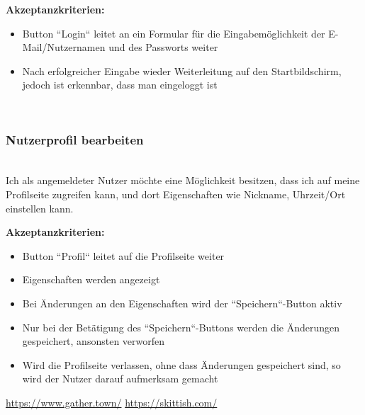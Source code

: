 \documentclass[conference]{IEEEtran}
\begin{document}
	\textbf{Akzeptanzkriterien:}
	\begin{itemize}
		\item Button ``Login`` leitet an ein Formular für die Eingabemöglichkeit der E-Mail/Nutzernamen und des Passworts weiter
		\item Nach erfolgreicher Eingabe wieder Weiterleitung auf den Startbildschirm, jedoch ist erkennbar, dass man eingeloggt ist
	\end{itemize}
	
	\ \\
	\subsubsection{Nutzerprofil bearbeiten}
	\ \\
	Ich als angemeldeter Nutzer möchte eine Möglichkeit besitzen, dass ich auf meine Profilseite zugreifen kann, und dort Eigenschaften wie Nickname, Uhrzeit/Ort einstellen kann.
	
	\textbf{Akzeptanzkriterien:}
	\begin{itemize}
		\item Button ``Profil`` leitet auf die Profilseite weiter
		\item Eigenschaften werden angezeigt
		\item Bei Änderungen an den Eigenschaften wird der ``Speichern``-Button aktiv
		\item Nur bei der Betätigung des ``Speichern``-Buttons werden die Änderungen gespeichert, ansonsten verworfen
		\item Wird die Profilseite verlassen, ohne dass Änderungen gespeichert sind, so wird der Nutzer darauf aufmerksam gemacht
	\end{itemize}
	
	\begin{thebibliography}{99}
		
	 \url{https://www.gather.town/} 
	 \url{https://skittish.com/}
	
	
	\end{thebibliography}
\end{document}
